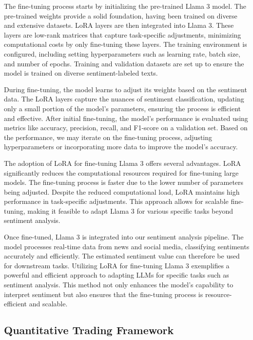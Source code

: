 \documentclass[conference]{IEEEtran}
\begin{document}
The fine-tuning process starts by initializing the pre-trained Llama 3 model. The pre-trained weights provide a solid foundation, having been trained on diverse and extensive datasets. LoRA layers are then integrated into Llama 3. These layers are low-rank matrices that capture task-specific adjustments, minimizing computational costs by only fine-tuning these layers. The training environment is configured, including setting hyperparameters such as learning rate, batch size, and number of epochs. Training and validation datasets are set up to ensure the model is trained on diverse sentiment-labeled texts.

During fine-tuning, the model learns to adjust its weights based on the sentiment data. The LoRA layers capture the nuances of sentiment classification, updating only a small portion of the model's parameters, ensuring the process is efficient and effective. After initial fine-tuning, the model's performance is evaluated using metrics like accuracy, precision, recall, and F1-score on a validation set. Based on the performance, we may iterate on the fine-tuning process, adjusting hyperparameters or incorporating more data to improve the model's accuracy.

The adoption of LoRA for fine-tuning Llama 3 offers several advantages. LoRA significantly reduces the computational resources required for fine-tuning large models. The fine-tuning process is faster due to the lower number of parameters being adjusted. Despite the reduced computational load, LoRA maintains high performance in task-specific adjustments. This approach allows for scalable fine-tuning, making it feasible to adapt Llama 3 for various specific tasks beyond sentiment analysis.

Once fine-tuned, Llama 3 is integrated into our sentiment analysis pipeline. The model processes real-time data from news and social media, classifying sentiments accurately and efficiently. The estimated sentiment value can therefore be used for downstream tasks. Utilizing LoRA for fine-tuning Llama 3 exemplifies a powerful and efficient approach to adapting LLMs for specific tasks such as sentiment analysis. This method not only enhances the model's capability to interpret sentiment but also ensures that the fine-tuning process is resource-efficient and scalable.

\subsection{\textbf{Quantitative Trading Framework}}
\end{document}
